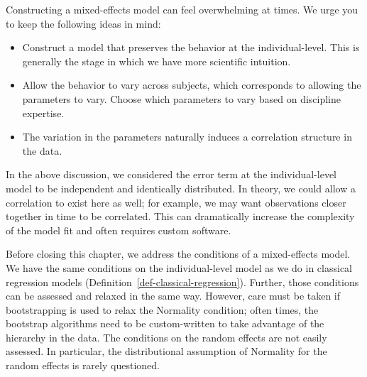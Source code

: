 \documentclass[
  letterpaper,
  DIV=11,
  numbers=noendperiod]{scrreprt}
\providecommand{\tightlist}{%
  \setlength{\itemsep}{0pt}\setlength{\parskip}{0pt}}\usepackage{longtable,booktabs,array}
\theoremstyle{definition}
\theoremstyle{definition}
\theoremstyle{remark}
\begin{document}
\begin{tcolorbox}[enhanced jigsaw, left=2mm, toprule=.15mm, arc=.35mm, breakable, opacitybacktitle=0.6, opacityback=0, rightrule=.15mm, colbacktitle=quarto-callout-note-color!10!white, coltitle=black, leftrule=.75mm, toptitle=1mm, colframe=quarto-callout-note-color-frame, titlerule=0mm, title=\textcolor{quarto-callout-note-color}{\faInfo}\hspace{0.5em}{Considerations when Building a Mixed-Effects Model}, bottomrule=.15mm, colback=white, bottomtitle=1mm]

Constructing a mixed-effects model can feel overwhelming at times. We
urge you to keep the following ideas in mind:

\begin{itemize}
\tightlist
\item
  Construct a model that preserves the behavior at the individual-level.
  This is generally the stage in which we have more scientific
  intuition.
\item
  Allow the behavior to vary across subjects, which corresponds to
  allowing the parameters to vary. Choose which parameters to vary based
  on discipline expertise.
\item
  The variation in the parameters naturally induces a correlation
  structure in the data.
\end{itemize}

\end{tcolorbox}

In the above discussion, we considered the error term at the
individual-level model to be independent and identically distributed. In
theory, we could allow a correlation to exist here as well; for example,
we may want observations closer together in time to be correlated. This
can dramatically increase the complexity of the model fit and often
requires custom software.

Before closing this chapter, we address the conditions of a
mixed-effects model. We have the same conditions on the individual-level
model as we do in classical regression models
(Definition~\ref{def-classical-regression}). Further, those conditions
can be assessed and relaxed in the same way. However, care must be taken
if bootstrapping is used to relax the Normality condition; often times,
the bootstrap algorithms need to be custom-written to take advantage of
the hierarchy in the data. The conditions on the random effects are not
easily assessed. In particular, the distributional assumption of
Normality for the random effects is rarely questioned.
\end{document}
